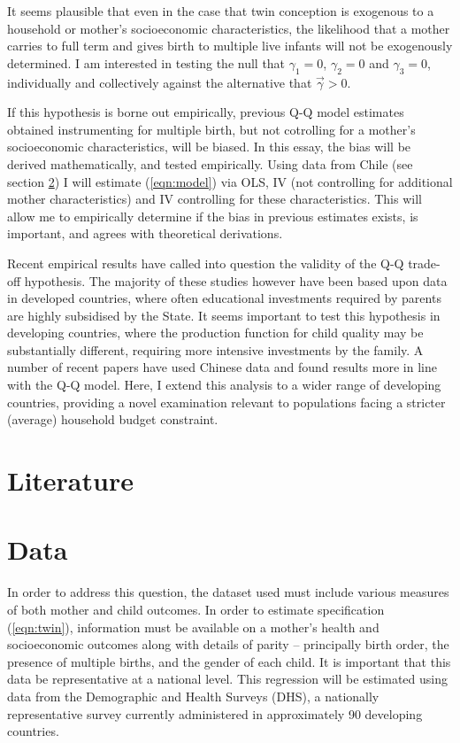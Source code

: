 \documentclass{article}[11pt,subeqn]
\begin{document}
\begin{spacing}{1.25}
It seems plausible that even in the case that twin conception is exogenous to a household or mother's
socioeconomic characteristics, the likelihood that a mother carries to full term and gives birth to
multiple live infants will not be exogenously determined.  I am interested in testing the null that
$\gamma_1=0$, $\gamma_2=0$ and $\gamma_3=0$, individually and collectively against the alternative
that $\vec{\gamma}>0$.

If this hypothesis is borne out empirically, previous Q-Q model estimates obtained instrumenting for
multiple birth, but not cotrolling for a mother's socioeconomic characteristics, will be biased. In this
essay, the bias will be derived mathematically, and tested empirically.  Using data from Chile (see
section \ref{scn:data}) I will estimate (\ref{eqn:model}) via OLS, IV (not controlling for additional
mother characteristics) and IV controlling for these characteristics.  This will allow me to empirically
determine if the bias in previous estimates exists, is important, and agrees with theoretical
derivations.

Recent empirical results have called into question the validity of the Q-Q trade-off hypothesis.  The majority of
these studies however have been based upon data in developed countries, where often educational investments
required by parents are highly subsidised by the State.  It seems important to test this hypothesis in developing
countries, where the production function for child quality may be substantially different, requiring more intensive
investments by the family.  A number of recent papers have used Chinese data and found results
more in line with the Q-Q model.  Here, I extend this analysis to a wider range of developing countries, providing
a novel examination relevant to populations facing a stricter (average) household budget constraint.
\vspace{-5mm}
\section{Literature}
\label{scn:lit}
\vspace{-5mm}

\section{Data}
\label{scn:data}
\vspace{-5mm}
In order to address this question, the dataset used must include various measures of both mother and child
outcomes. In order to estimate specification (\ref{eqn:twin}), information must be available on a mother's
health and socioeconomic outcomes along with details of parity -- principally birth order, the presence
of multiple births, and the gender of each child.  It is important that this data be representative at a
national level.  This regression will be estimated using data from the Demographic and Health Surveys (DHS),
a nationally representative survey currently administered in approximately 90 developing countries.


\end{spacing}
\end{document}

